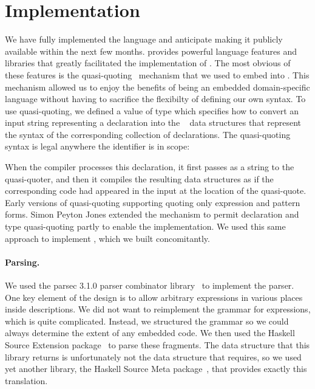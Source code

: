 \section{Implementation}
\label{sec:implementation}
We have fully implemented the \forest{} language and anticipate making
it publicly available within the next few months.
\haskell{} provides powerful language features and libraries that
greatly facilitated the implementation of \forest{}.  The most obvious
of these features is the quasi-quoting~\cite{Mainland:quasi} mechanism
that we used to embed \forest{} into \haskell{}.  This mechanism
allowed us to enjoy the benefits of being an embedded domain-specific
language without having to sacrifice the flexibilty of
defining our own syntax. To use quasi-quoting, we defined a \haskell{}
value  of type  which specifies how to
convert an input string representing a \forest{} declaration into the
\template{}~\cite{Sheard+:templatehaskell} 
data structures that represent the syntax of the
corresponding collection of \haskell{} declarations.
The quasi-quoting syntax is legal anywhere the identifier  is in scope:
\begin{code}
\end{code}
When the \haskell{} compiler processes this declaration, it first
passes  as a string to the  quasi-quoter, and
then it compiles the resulting \template{} data structures as if the
corresponding \haskell{} code had appeared in the input at the
location of the quasi-quote.  Early versions of quasi-quoting
supporting quoting only expression and pattern forms.  Simon Peyton
Jones extended the mechanism to permit declaration and type
quasi-quoting partly to enable the \forest{} implementation.  We used
this same approach to implement \padshaskell{}, which we built
concomitantly. 

\paragraph{Parsing.}  
We used the parsec 3.1.0 parser
combinator library~\cite{LeijenMeijer:parsec} to implement the \forest{} parser.  One key element
of the \forest{} design is to allow arbitrary \haskell{} expressions
in various places inside \forest{} descriptions.  We did not want to
reimplement the grammar for \haskell{} expressions, which is quite
complicated.  Instead, we structured the \forest{} grammar so we could
always determine the extent of any embedded \haskell{} code.  We then
used the Haskell Source Extension package~\cite{haskell-src-exts} to parse
these fragments.  The data structure that this library returns is
unfortunately not the data structure that \template{} requires, so we
used yet another library, the Haskell Source Meta
package~\cite{haskell-src-meta}, that provides exactly this translation. 


